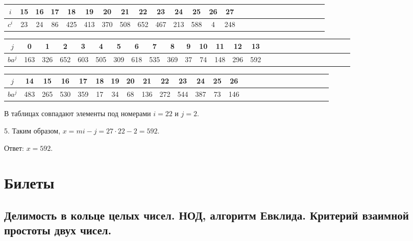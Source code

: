 \documentclass[a4paper,11pt,openany]{book}
\begin{document}
\medskip

{\centering
\begin{tabular}{||c|c|c|c|c|c|c|c|c|c|c|c|c|c|c|c|c|c|c|c|c|c|c|c|c|c||}
\hline
$i$ & 15 & 16 & 17 & 18 & 19 & 20 & 21 & 22 & 23 & 24 & 25 & 26 & 27 \\
\hline
$c^i$ & 23 & 24 & 86 & 425 & 413 & 370 & 508 & 652 & 467 & 213 & 588 & 4 & 248 \\
\hline
\end{tabular}

}

\medskip

{\centering
\begin{tabular}{||c|c|c|c|c|c|c|c|c|c|c|c|c|c|c|c|c|c|c|c|c|c|c|c|c|c|c||}
\hline
$j$ & 0 & 1 & 2 & 3 & 4 & 5 & 6 & 7 & 8 & 9 & 10 & 11 & 12 & 13 \\
\hline
$ba^j$ & 163 & 326 & 652 & 603 & 505 & 309 & 618 & 535 & 369 & 37 & 74 & 148 & 296 & 592 \\
\hline
\end{tabular}

}

\medskip

{\centering
\begin{tabular}{||c|c|c|c|c|c|c|c|c|c|c|c|c|c|c|c|c|c|c|c|c|c|c|c|c|c||}
\hline
$j$ & 14 & 15 & 16 & 17 & 18 & 19 & 20 & 21 & 22 & 23 & 24 & 25 & 26 \\
\hline
$ba^j$ & 483 & 265 & 530 & 359 & 17 & 34 & 68 & 136 & 272 & 544 & 387 & 73 & 146 \\
\hline
\end{tabular}

}

\medskip

\noindent В таблицах совпадают элементы под номерами $i = 22$ и $j = 2.$

5. Таким образом, $x = mi - j = 27 \cdot 22 - 2 = 592.$ 

\noindent Ответ: $x = 592$.

\section{}

\chapter{Билеты}
\section{Делимость в кольце целых чисел. НОД, алгоритм Евклида. Критерий взаимной простоты двух чисел.}
\end{document}
